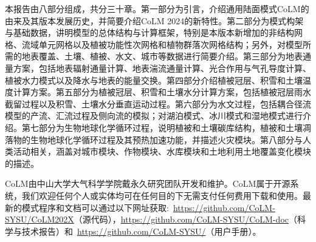 本报告由八部分组成，共分三十章。第一部分为引言，介绍通用陆面模式CoLM的由来及其版本发展历史，并简要介绍CoLM 2024的新特性。第二部分为模式构架与基础数据，讲明模型的总体结构与计算框架，特别是本版本新增加的非结构网格、流域单元网格以及植被功能性次网格和植物群落次网格结构；另外，对模型所需的地表覆盖、土壤、植被、水文、城市等数据进行简要介绍。第三部分为地表通量方案，包括地表辐射通量计算、地表湍流通量计算、光合作用与气孔导度计算、植被水力模式以及降水与地表的能量交换。第四部分介绍植被冠层、积雪和土壤温度计算方案。第五部分为植被冠层、积雪和土壤水分计算方案，包括植被冠层雨水截留过程以及积雪、土壤水分垂直运动过程。第六部分为水文过程，包括耦合径流模型的产流、汇流过程及侧向流的模拟；对湖泊模式、冰川模式和湿地模式进行介绍。第七部分为生物地球化学循环过程，说明植被和土壤碳库结构，植被和土壤凋落物的生物地球化学循环过程及其预热加速功能，并描述火灾模块。第八部分与人类活动相关，涵盖对城市模块、作物模块、水库模块和土地利用土地覆盖变化模块的描述。

CoLM由中山大学大气科学学院戴永久研究团队开发和维护。CoLM属于开源系统，我们欢迎任何个人或实体均可在任何目的下无需支付任何费用下载和使用。最新的模式程序和文档可以通过以下网址获取:~\url{https://github.com/CoLM-SYSU/CoLM202X}（源代码），\url{https://github.com/CoLM-SYSU/CoLM-doc}（科学与技术报告）和~\url{https://github.com/CoLM-SYSU/}（用户手册）。
